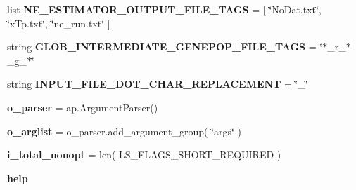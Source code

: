 \begin{DoxyCompactItemize}
\item 
list {\bfseries N\+E\+\_\+\+E\+S\+T\+I\+M\+A\+T\+O\+R\+\_\+\+O\+U\+T\+P\+U\+T\+\_\+\+F\+I\+L\+E\+\_\+\+T\+A\+GS} = \mbox{[} \char`\"{}No\+Dat.\+txt\char`\"{}, \char`\"{}x\+Tp.\+txt\char`\"{}, \char`\"{}ne\+\_\+run.\+txt\char`\"{} \mbox{]}\hypertarget{namespacenegui_1_1pgdriveneestimator_a167fb016fbc3709c4c778c4a5157cd06}{}\label{namespacenegui_1_1pgdriveneestimator_a167fb016fbc3709c4c778c4a5157cd06}

\item 
string {\bfseries G\+L\+O\+B\+\_\+\+I\+N\+T\+E\+R\+M\+E\+D\+I\+A\+T\+E\+\_\+\+G\+E\+N\+E\+P\+O\+P\+\_\+\+F\+I\+L\+E\+\_\+\+T\+A\+GS} = \char`\"{}$\ast$\+\_\+r\+\_\+$\ast$\+\_\+g\+\_\+$\ast$\char`\"{}\hypertarget{namespacenegui_1_1pgdriveneestimator_a1bb977fffd730588ade2008f702d6110}{}\label{namespacenegui_1_1pgdriveneestimator_a1bb977fffd730588ade2008f702d6110}

\item 
string {\bfseries I\+N\+P\+U\+T\+\_\+\+F\+I\+L\+E\+\_\+\+D\+O\+T\+\_\+\+C\+H\+A\+R\+\_\+\+R\+E\+P\+L\+A\+C\+E\+M\+E\+NT} = \char`\"{}\+\_\+\char`\"{}\hypertarget{namespacenegui_1_1pgdriveneestimator_ae33783002cdab9bc1d96f7cfe99a0ec9}{}\label{namespacenegui_1_1pgdriveneestimator_ae33783002cdab9bc1d96f7cfe99a0ec9}

\item 
{\bfseries o\+\_\+parser} = ap.\+Argument\+Parser()\hypertarget{namespacenegui_1_1pgdriveneestimator_a5d6d3756a8ddff6ece719654fb970636}{}\label{namespacenegui_1_1pgdriveneestimator_a5d6d3756a8ddff6ece719654fb970636}

\item 
{\bfseries o\+\_\+arglist} = o\+\_\+parser.\+add\+\_\+argument\+\_\+group( \char`\"{}args\char`\"{} )\hypertarget{namespacenegui_1_1pgdriveneestimator_a22a84c6d9023007cf69fd2e3d62dcb86}{}\label{namespacenegui_1_1pgdriveneestimator_a22a84c6d9023007cf69fd2e3d62dcb86}

\item 
{\bfseries i\+\_\+total\+\_\+nonopt} = len( L\+S\+\_\+\+F\+L\+A\+G\+S\+\_\+\+S\+H\+O\+R\+T\+\_\+\+R\+E\+Q\+U\+I\+R\+ED )\hypertarget{namespacenegui_1_1pgdriveneestimator_aa4e6982ff99236ac13e0af4c4d6e8839}{}\label{namespacenegui_1_1pgdriveneestimator_aa4e6982ff99236ac13e0af4c4d6e8839}

\item 
{\bfseries help}\hypertarget{namespacenegui_1_1pgdriveneestimator_ad407ca10f30961eabc0630c21fe8da45}{}\label{namespacenegui_1_1pgdriveneestimator_ad407ca10f30961eabc0630c21fe8da45}


\end{DoxyCompactItemize}
